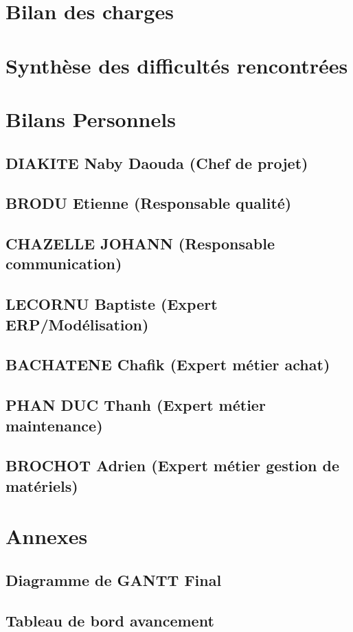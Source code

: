 \section{Bilan des charges}




\section{Synthèse des difficultés rencontrées}




\section{Bilans Personnels}

       \subsection{DIAKITE Naby Daouda (Chef de projet)}

       \subsection{BRODU Etienne (Responsable qualité)}

       \subsection{CHAZELLE JOHANN (Responsable communication)}

       \subsection{LECORNU Baptiste (Expert ERP/Modélisation)}

       \subsection{BACHATENE Chafik (Expert métier achat)}

       \subsection{PHAN DUC Thanh (Expert métier maintenance)}

       \subsection{BROCHOT Adrien (Expert métier gestion de matériels)}


\section{Annexes}

       \subsection{Diagramme de GANTT Final}


       \subsection{Tableau de bord avancement}





